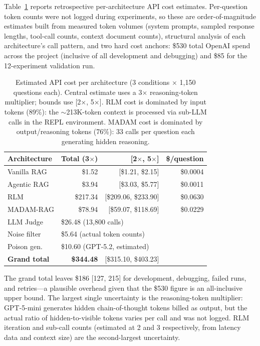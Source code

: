 \documentclass[11pt]{article}
\begin{document}
Table~\ref{tab:api_cost} reports retrospective per-architecture API cost estimates. Per-question token counts were not logged during experiments, so these are order-of-magnitude estimates built from measured token volumes (system prompts, sampled response lengths, tool-call counts, context document counts), structural analysis of each architecture's call pattern, and two hard cost anchors: \$530 total OpenAI spend across the project (inclusive of all development and debugging) and \$85 for the 12-experiment validation run.

\begin{table}[H]
\centering
\caption{Estimated API cost per architecture (3 conditions $\times$ 1,150 questions each). Central estimate uses a 3$\times$ reasoning-token multiplier; bounds use [2$\times$, 5$\times$]. RLM cost is dominated by input tokens (89\%): the $\sim$213K-token context is processed via sub-LLM calls in the REPL environment. MADAM cost is dominated by output/reasoning tokens (76\%): 33 calls per question each generating hidden reasoning.}
\label{tab:api_cost}
\begin{tabular}{lrrr}
\toprule
Architecture & Total (3$\times$) & [2$\times$, 5$\times$] & \$/question \\
\midrule
Vanilla RAG  & \$1.52   & [\$1.21, \$2.15]     & \$0.0004 \\
Agentic RAG  & \$3.94   & [\$3.03, \$5.77]     & \$0.0011 \\
RLM          & \$217.34 & [\$209.06, \$233.90] & \$0.0630 \\
MADAM-RAG    & \$78.94  & [\$59.07, \$118.69]  & \$0.0229 \\
\midrule
LLM Judge    & \multicolumn{3}{l}{\$26.48 (13{,}800 calls)} \\
Noise filter & \multicolumn{3}{l}{\$5.64 (actual token counts)} \\
Poison gen.  & \multicolumn{3}{l}{\$10.60 (GPT-5.2, estimated)} \\
\midrule
\textbf{Grand total} & \textbf{\$344.48} & \multicolumn{2}{l}{[\$315.10, \$403.23]} \\
\bottomrule
\end{tabular}
\end{table}

The grand total leaves \$186 [127, 215] for development, debugging, failed runs, and retries---a plausible overhead given that the \$530 figure is an all-inclusive upper bound. The largest single uncertainty is the reasoning-token multiplier: GPT-5-mini generates hidden chain-of-thought tokens billed as output, but the actual ratio of hidden-to-visible tokens varies per call and was not logged. RLM iteration and sub-call counts (estimated at 2 and 3 respectively, from latency data and context size) are the second-largest uncertainty.
\end{document}
